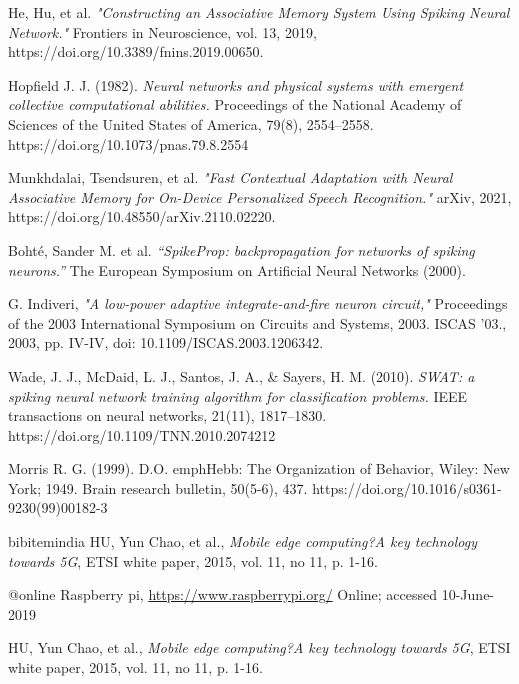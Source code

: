 \begin{thebibliography}{99}

	He, Hu, et al. \emph{"Constructing an Associative Memory System Using Spiking Neural Network."} Frontiers in Neuroscience, vol. 13, 2019, https://doi.org/10.3389/fnins.2019.00650.

	Hopfield J. J. (1982). \emph{Neural networks and physical systems with emergent collective computational abilities.} Proceedings of the National Academy of Sciences of the United States of America, 79(8), 2554–2558. https://doi.org/10.1073/pnas.79.8.2554

	Munkhdalai, Tsendsuren, et al. \emph{"Fast Contextual Adaptation with Neural Associative Memory for On-Device Personalized Speech Recognition."} arXiv, 2021, https://doi.org/10.48550/arXiv.2110.02220.

	Bohté, Sander M. et al. \emph{“SpikeProp: backpropagation for networks of spiking neurons.”} The European Symposium on Artificial Neural Networks (2000).

	G. Indiveri, \emph{"A low-power adaptive integrate-and-fire neuron circuit,"} Proceedings of the 2003 International Symposium on Circuits and Systems, 2003. ISCAS '03., 2003, pp. IV-IV, doi: 10.1109/ISCAS.2003.1206342.

	Wade, J. J., McDaid, L. J., Santos, J. A., \& Sayers, H. M. (2010). \emph{SWAT: a spiking neural network training algorithm for classification problems.} IEEE transactions on neural networks, 21(11), 1817–1830. https://doi.org/10.1109/TNN.2010.2074212

	Morris R. G. (1999). D.O. emph{Hebb: The Organization of Behavior,} Wiley: New York; 1949. Brain research bulletin, 50(5-6), 437. https://doi.org/10.1016/s0361-9230(99)00182-3

	bibitem{india} HU, Yun Chao, et al., \emph{Mobile edge computing?A key
		technology towards 5G}, ETSI white paper, 2015, vol. 11, no 11, p. 1-16.

	@online{ Raspberry pi,
		\url{https://www.raspberrypi.org/}
		Online; accessed 10-June-2019
	}

	 HU, Yun Chao, et al., \emph{Mobile edge computing?A key technology
		towards 5G}, ETSI white paper, 2015, vol. 11, no 11, p. 1-16.
\end{thebibliography}

